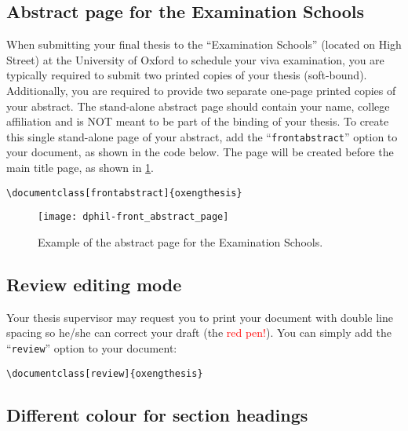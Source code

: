 \subsection{Abstract page for the Examination Schools}


When submitting your final thesis to the ``Examination Schools'' (located on High Street) at the University of Oxford to schedule your viva examination, you are typically required to submit two printed copies of your thesis (soft-bound). Additionally, you are required to provide two separate one-page printed copies of your abstract. The stand-alone abstract page should contain your name, college affiliation and is NOT meant to be part of the binding of your thesis. To create this single stand-alone page of your abstract, add the ``\verb|frontabstract|'' option to your document, as shown in the code below. The page will be created before the main title page, as shown in \cref{fig:ch0:dphil-front_abstract_page}.


\begin{lstlisting}[style=custom-latex]
\documentclass[frontabstract]{oxengthesis}
\end{lstlisting}


\begin{figure}[htb]
    \centering
    \texttt{[image: dphil-front\_abstract\_page]}
    \caption[Example of the abstract page for the Examination Schools]
    {
        Example of the abstract page for the Examination Schools.
        \label{fig:ch0:dphil-front_abstract_page}
    }
\end{figure}


\subsection{Review editing mode}


Your thesis supervisor may request you to print your document with double line spacing so he/she can correct your draft (the \textcolor{red}{red pen!}). You can simply add the ``\verb|review|'' option to your document:


\begin{lstlisting}[style=custom-latex]
\documentclass[review]{oxengthesis}
\end{lstlisting}


\subsection{Different colour for section headings}


